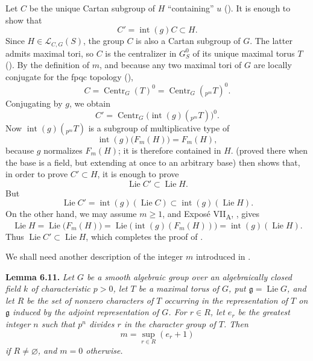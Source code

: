 Let \(C\) be the unique Cartan subgroup of \(H\) ``containing'' \(u\)
(). It is enough to show that
\[
C'=\operatorname{int}(g)C\subset H.
\]
Since \(H\in\mathcal L_{C,G}(S)\), the group \(C\) is also a Cartan subgroup
of \(G\). The latter admits maximal tori, so \(C\) is the centralizer in
\(G_S^0\) of its unique maximal torus \(T\) ().
By the definition of \(m\), and because any two maximal tori of \(G\) are
locally conjugate for the fpqc topology (),
\[
C=\operatorname{Centr}_G(T)^0
 =\operatorname{Centr}_G({}_{p^m}T)^0.
\]
Conjugating by \(g\), we obtain
\[
C'=\operatorname{Centr}_G\bigl(\operatorname{int}(g)({}_{p^m}T)\bigr)^0.
\]
Now \(\operatorname{int}(g)({}_{p^m}T)\) is a subgroup of multiplicative
type of
\[
\operatorname{int}(g)\bigl(F_m(H)\bigr)=F_m(H),
\]
because \(g\) normalizes \(F_m(H)\); it is therefore contained in \(H\).
 (proved there when the base is a field, but extending at
once to an arbitrary base) then shows that, in order to prove
\(C'\subset H\), it is enough to prove
\[
\operatorname{Lie}C'\subset\operatorname{Lie}H.
\]
But
\[
\operatorname{Lie}C'
 =\operatorname{int}(g)(\operatorname{Lie}C)
 \subset\operatorname{int}(g)(\operatorname{Lie}H).
\]
On the other hand, we may assume \(m\geq1\), and Exposé
VII\textsubscript{A}, , gives
\[
\operatorname{Lie}H
 =\operatorname{Lie}\bigl(F_m(H)\bigr)
 =\operatorname{Lie}\bigl(\operatorname{int}(g)(F_m(H))\bigr)
 =\operatorname{int}(g)(\operatorname{Lie}H).
\]
Thus \(\operatorname{Lie}C'\subset\operatorname{Lie}H\), which completes
the proof of .

We shall need another description of the integer \(m\) introduced in .

\textbf{Lemma 6.11.} \emph{Let \(G\) be a smooth algebraic group over an
algebraically closed field \(k\) of characteristic \(p>0\), let \(T\) be a
maximal torus of \(G\), put \(\mathfrak g=\operatorname{Lie}G\), and let \(R\)
be the set of nonzero characters of \(T\) occurring in the representation of
\(T\) on \(\mathfrak g\) induced by the adjoint representation of \(G\).
For \(r\in R\), let \(e_r\) be the greatest integer \(n\) such that \(p^n\)
divides \(r\) in the character group of \(T\). Then
\[
m=\sup_{r\in R}(e_r+1)
\]
if \(R\neq\varnothing\), and \(m=0\) otherwise.}

